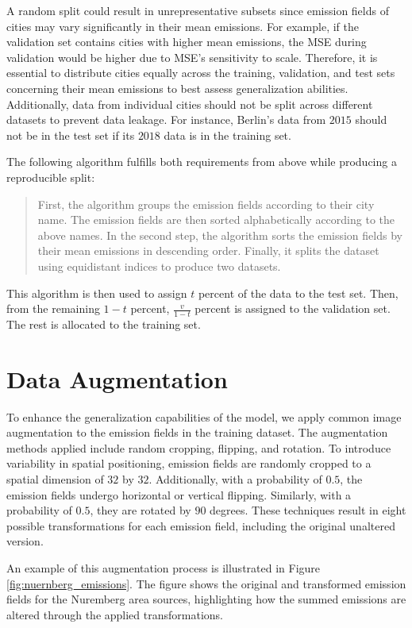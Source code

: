 A random split could result in unrepresentative subsets since emission fields of cities may vary significantly in their mean emissions.
For example, if the validation set contains cities with higher mean emissions, the \gls{MSE} during validation would be higher due to \gls{MSE}'s sensitivity to scale.
Therefore, it is essential to distribute cities equally across the training, validation, and test sets concerning their mean emissions to best assess generalization abilities.
Additionally, data from individual cities should not be split across different datasets to prevent data leakage.
For instance, Berlin's data from $2015$ should not be in the test set if its $2018$ data is in the training set.

The following algorithm fulfills both requirements from above while producing a reproducible split:

\begin{quotation}
First, the algorithm groups the emission fields according to their city name.
The emission fields are then sorted alphabetically according to the above names.
In the second step, the algorithm sorts the emission fields by their mean emissions in descending order.
Finally, it splits the dataset using equidistant indices to produce two datasets.
\end{quotation}

This algorithm is then used to assign $t$ percent of the data to the test set.
Then, from the remaining $1 - t$ percent, $\frac{v}{1 - t}$ percent is assigned to the validation set.
The rest is allocated to the training set.

\section{Data Augmentation}
To enhance the generalization capabilities of the model, we apply common image augmentation \parencite{ImageAugmentation} to the emission fields in the training dataset.
The augmentation methods applied include random cropping, flipping, and rotation.
To introduce variability in spatial positioning, emission fields are randomly cropped to a spatial dimension of $32$ by $32$.
Additionally, with a probability of $0.5$, the emission fields undergo horizontal or vertical flipping.
Similarly, with a probability of $0.5$, they are rotated by $90$ degrees.
These techniques result in eight possible transformations for each emission field, including the original unaltered version.

An example of this augmentation process is illustrated in Figure \ref{fig:nuernberg_emissions}.
The figure shows the original and transformed emission fields for the Nuremberg area sources, highlighting how the summed emissions are altered through the applied transformations.

